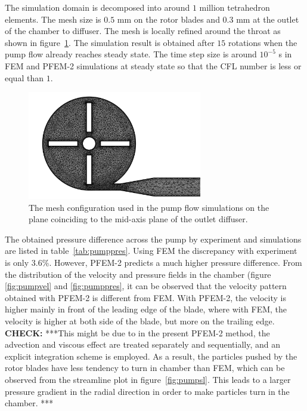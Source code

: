 The simulation domain is decomposed into around $1$ million tetrahedron elements. The mesh size is $0.5$ mm on the rotor blades and $0.3$ mm at the outlet of the chamber to diffuser. The mesh is locally refined around the throat as shown in figure~\ref{fig:pumpmesh}. The simulation result is obtained after $15$ rotations when the pump flow already reaches steady state. The time step size is around $10^{-5}$ s in FEM and PFEM-2 simulations at steady state so that the CFL number is less or equal than $1$.  

\begin{figure}[htbp]
    \centering
    \includegraphics[width=3in]{imgs/nozzle_pump/pump_mesh.pdf}
    \caption{The mesh configuration used in the pump flow simulations on the plane coinciding to the mid-axis plane of the outlet diffuser.}
    \label{fig:pumpmesh}
\end{figure}

The obtained pressure difference across the pump by experiment and simulations are listed in table~\ref{tab:pumppres}. Using FEM the discrepancy with experiment is only $3.6$\%. However, PFEM-2 predicts a much higher pressure difference. From the distribution of the velocity and pressure fields in the chamber (figure \ref{fig:pumpvel} and \ref{fig:pumppres}, it can be observed that the velocity pattern obtained with PFEM-2 is different from FEM. With PFEM-2, the velocity is higher mainly in front of the leading edge of the blade, where with FEM, the velocity is higher at both side of the blade, but more on the trailing edge. \textbf{CHECK:} ***This might be due to in the present PFEM-2 method, the advection and viscous effect are treated separately and sequentially, and an explicit integration scheme is employed. As a result, the particles pushed by the rotor blades have less tendency to turn in chamber than FEM, which can be observed from the streamline plot in figure~\ref{fig:pumpsl}. This leads to a larger pressure gradient in the radial direction in order to make particles turn in the chamber. ***

